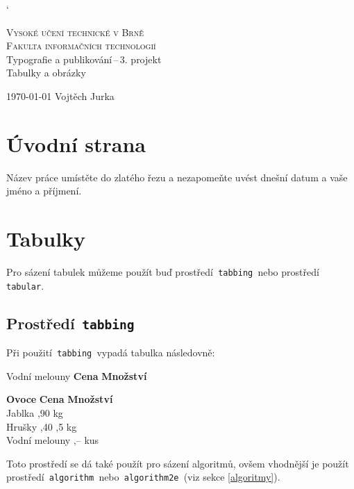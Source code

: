 \documentclass[a4paper, 11pt]{article}
\begin{document}
\catcode`


\begin{titlepage}
		\begin{center}
			\Huge
			\textsc{Vysoké učení technické v Brně} \\
			\huge
			\textsc{Fakulta informačních technologií} \\
			\LARGE
			Typografie a publikování\,--\,3. projekt \\
			\Huge
			Tabulky a obrázky
		\end{center}

		{\Large
			\today
			\hfill
			Vojtěch Jurka
		}
	\end{titlepage}
	
\section{Úvodní strana}
Název práce umístěte do zlatého řezu a nezapomeňte uvést dnešní datum a vaše jméno a příjmení.

\section{Tabulky}
Pro sázení tabulek můžeme použít buď prostředí\texttt{ tabbing }nebo prostředí\texttt{ tabular}.

\subsection{Prostředí\texttt{ tabbing }}

Při použití\texttt{ tabbing }vypadá tabulka následovně:
\begin{tabbing}
Vodní melouny \quad \= \textbf{Cena} \quad \= \textbf{Množství}	\kill

		\textbf{Ovoce} \> \textbf{Cena}	\> \textbf{Množství}	\\
		Jablka				,90				 kg		\\
		Hrušky				,40				,5 kg	\\
		Vodní melouny		,--				 kus	\\
\end{tabbing}

\noindent Toto prostředí se dá také použít pro sázení algoritmů, ovšem vhodnější je použít prostředí\texttt{ algorithm~}nebo\texttt{ algorithm2e }(viz sekce \ref{algoritmy}).
\end{document}
